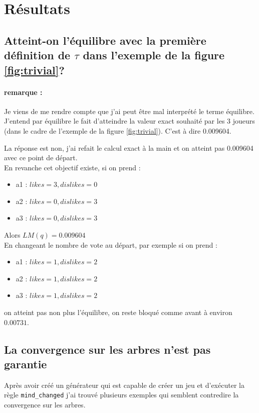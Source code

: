 \documentclass[12pt]{article}
\theoremstyle{defi}
\theoremstyle{not}
\theoremstyle{prob}
\begin{document}
  \section{Résultats}
    \subsection{Atteint-on l'équilibre avec la première définition de $\tau$ dans l'exemple de la figure \ref{fig:trivial}?}

      \paragraph{remarque :}
        Je viens de me rendre compte que j'ai peut être mal interprété le terme équilibre.
        J'entend par équilibre le fait d'atteindre la valeur exact souhaité par les 3 joueurs (dans le cadre de l'exemple de la figure \ref{fig:trivial}).
        C'est à dire 0.009604.

        La réponse est non, j'ai refait le calcul exact à la main et on atteint pas 0.009604 avec ce point de départ.\\

    En revanche cet objectif existe, si on prend :
    \begin{itemize}
      \item a1 : $likes = 3, dislikes = 0$
      \item a2 : $likes = 0, dislikes = 3$
      \item a3 : $likes = 0, dislikes = 3$
    \end{itemize}

    Alors $LM(q) = 0.009604$\\

    En changeant le nombre de vote au départ, par exemple si on prend :
    \begin{itemize}
      \item a1 : $likes = 1, dislikes = 2$
      \item a2 : $likes = 1, dislikes = 2$
      \item a3 : $likes = 1, dislikes = 2$
    \end{itemize}

    on atteint pas non plus l'équilibre, on reste bloqué comme avant à environ $0.00731$.
\color{blue}
    \subsection{La convergence sur les arbres n'est pas garantie}
      Après avoir créé un générateur qui est capable de créer un jeu et d'exécuter la règle \texttt{mind\_changed} j'ai trouvé plusieurs exemples qui semblent contredire la convergence sur les arbres.
\end{document}
